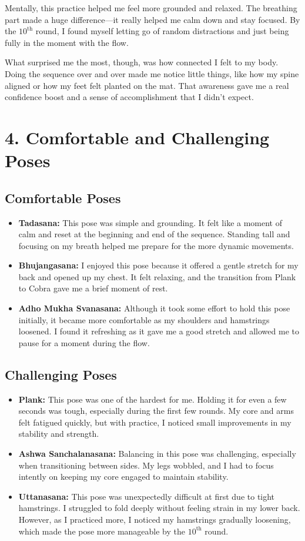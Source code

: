 \documentclass[a4paper,10.5pt]{article}
\begin{document}
Mentally, this practice helped me feel more grounded and relaxed. The breathing part made a huge difference—it really helped me calm down and stay focused. By the $10^{\mathrm{th}}$ round, I found myself letting go of random distractions and just being fully in the moment with the flow.

What surprised me the most, though, was how connected I felt to my body. Doing the sequence over and over made me notice little things, like how my spine aligned or how my feet felt planted on the mat. That awareness gave me a real confidence boost and a sense of accomplishment that I didn’t expect.

\section*{4. Comfortable and Challenging Poses}
\subsection*{Comfortable Poses}
\begin{itemize}
    \item \textbf{Tadasana:} This pose was simple and grounding. It felt like a moment of calm and reset at the beginning and end of the sequence. Standing tall and focusing on my breath helped me prepare for the more dynamic movements.
    \item \textbf{Bhujangasana:} I enjoyed this pose because it offered a gentle stretch for my back and opened up my chest. It felt relaxing, and the transition from Plank to Cobra gave me a brief moment of rest.
    \item \textbf{Adho Mukha Svanasana:} Although it took some effort to hold this pose initially, it became more comfortable as my shoulders and hamstrings loosened. I found it refreshing as it gave me a good stretch and allowed me to pause for a moment during the flow.
\end{itemize}

\subsection*{Challenging Poses}
\begin{itemize}
    \item \textbf{Plank:} This pose was one of the hardest for me. Holding it for even a few seconds was tough, especially during the first few rounds. My core and arms felt fatigued quickly, but with practice, I noticed small improvements in my stability and strength.
    \item \textbf{Ashwa Sanchalanasana:} Balancing in this pose was challenging, especially when transitioning between sides. My legs wobbled, and I had to focus intently on keeping my core engaged to maintain stability.
    \item \textbf{Uttanasana:} This pose was unexpectedly difficult at first due to tight hamstrings. I struggled to fold deeply without feeling strain in my lower back. However, as I practiced more, I noticed my hamstrings gradually loosening, which made the pose more manageable by the $10^{\mathrm{th}}$ round.
\end{itemize}
\end{document}
